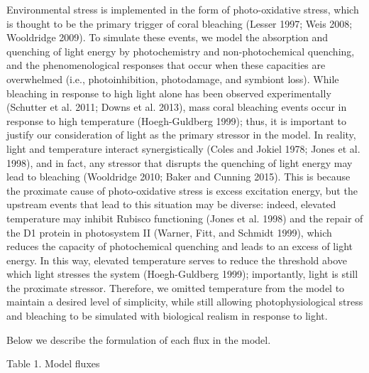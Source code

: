\documentclass[]{elsarticle} %
\begin{document}
Environmental stress is implemented in the form of photo-oxidative
stress, which is thought to be the primary trigger of coral bleaching
(Lesser 1997; Weis 2008; Wooldridge 2009). To simulate these events, we
model the absorption and quenching of light energy by photochemistry and
non-photochemical quenching, and the phenomenological responses that
occur when these capacities are overwhelmed (i.e., photoinhibition,
photodamage, and symbiont loss). While bleaching in response to high
light alone has been observed experimentally (Schutter et al. 2011;
Downs et al. 2013), mass coral bleaching events occur in response to
high temperature (Hoegh-Guldberg 1999); thus, it is important to justify
our consideration of light as the primary stressor in the model. In
reality, light and temperature interact synergistically (Coles and
Jokiel 1978; Jones et al. 1998), and in fact, any stressor that disrupts
the quenching of light energy may lead to bleaching (Wooldridge 2010;
Baker and Cunning 2015). This is because the proximate cause of
photo-oxidative stress is excess excitation energy, but the upstream
events that lead to this situation may be diverse: indeed, elevated
temperature may inhibit Rubisco functioning (Jones et al. 1998) and the
repair of the D1 protein in photosystem II (Warner, Fitt, and Schmidt
1999), which reduces the capacity of photochemical quenching and leads
to an excess of light energy. In this way, elevated temperature serves
to reduce the threshold above which light stresses the system
(Hoegh-Guldberg 1999); importantly, light is still the proximate
stressor. Therefore, we omitted temperature from the model to maintain a
desired level of simplicity, while still allowing photophysiological
stress and bleaching to be simulated with biological realism in response
to light.

Below we describe the formulation of each flux in the model.

Table 1. Model fluxes
\end{document}
